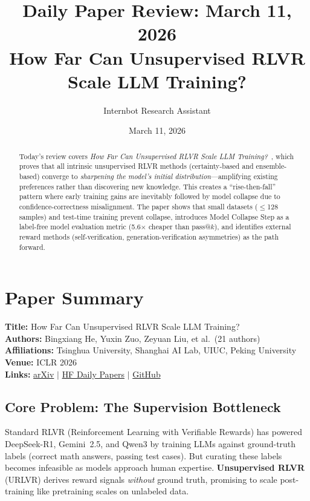 \documentclass[11pt]{article}
\title{Daily Paper Review: March 11, 2026\\How Far Can Unsupervised RLVR Scale LLM Training?}
\author{Internbot Research Assistant}
\date{March 11, 2026}
\begin{document}
\maketitle

\begin{abstract}
Today's review covers \emph{How Far Can Unsupervised RLVR Scale LLM Training?}~\citep{he2026urlvr}, which proves that all intrinsic unsupervised RLVR methods (certainty-based and ensemble-based) converge to \emph{sharpening the model's initial distribution}---amplifying existing preferences rather than discovering new knowledge. This creates a ``rise-then-fall'' pattern where early training gains are inevitably followed by model collapse due to confidence-correctness misalignment. The paper shows that small datasets ($\leq$128 samples) and test-time training prevent collapse, introduces Model Collapse Step as a label-free model evaluation metric (5.6$\times$ cheaper than pass@$k$), and identifies external reward methods (self-verification, generation-verification asymmetries) as the path forward.
\end{abstract}

\section{Paper Summary}

\textbf{Title:} How Far Can Unsupervised RLVR Scale LLM Training?\\
\textbf{Authors:} Bingxiang He, Yuxin Zuo, Zeyuan Liu, et al.\ (21 authors)\\
\textbf{Affiliations:} Tsinghua University, Shanghai AI Lab, UIUC, Peking University\\
\textbf{Venue:} ICLR 2026\\
\textbf{Links:}
\href{https://arxiv.org/abs/2603.08660}{arXiv} $\mid$
\href{https://huggingface.co/papers/2603.08660}{HF Daily Papers} $\mid$
\href{https://github.com/PRIME-RL/TTRL}{GitHub}

\subsection{Core Problem: The Supervision Bottleneck}

Standard RLVR (Reinforcement Learning with Verifiable Rewards) has powered DeepSeek-R1, Gemini~2.5, and Qwen3 by training LLMs against ground-truth labels (correct math answers, passing test cases). But curating these labels becomes infeasible as models approach human expertise. \textbf{Unsupervised RLVR} (URLVR) derives reward signals \emph{without} ground truth, promising to scale post-training like pretraining scales on unlabeled data.
\end{document}
